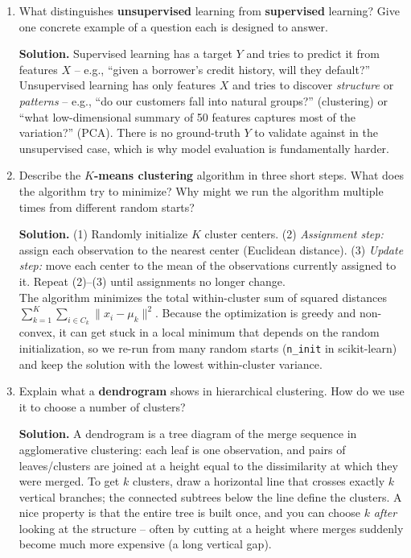 \documentclass[11pt]{article}
\newcommand{\solution}[1]{%
  \par\medskip\noindent\textbf{Solution.} #1\par\medskip
}
\begin{document}
\begin{enumerate}[leftmargin=*, resume]

\item What distinguishes \textbf{unsupervised} learning from \textbf{supervised} learning? Give one concrete example of a question each is designed to answer.

\solution{Supervised learning has a target $Y$ and tries to predict it from features $X$ -- e.g., ``given a borrower's credit history, will they default?'' Unsupervised learning has only features $X$ and tries to discover \emph{structure} or \emph{patterns} -- e.g., ``do our customers fall into natural groups?'' (clustering) or ``what low-dimensional summary of 50 features captures most of the variation?'' (PCA). There is no ground-truth $Y$ to validate against in the unsupervised case, which is why model evaluation is fundamentally harder.}

\item Describe the \textbf{$K$-means clustering} algorithm in three short steps. What does the algorithm try to minimize? Why might we run the algorithm multiple times from different random starts?

\solution{(1) Randomly initialize $K$ cluster centers. (2) \emph{Assignment step:} assign each observation to the nearest center (Euclidean distance). (3) \emph{Update step:} move each center to the mean of the observations currently assigned to it. Repeat (2)--(3) until assignments no longer change.\\
The algorithm minimizes the total within-cluster sum of squared distances $\sum_{k=1}^K \sum_{i \in C_k} \|x_i - \mu_k\|^2$. Because the optimization is greedy and non-convex, it can get stuck in a local minimum that depends on the random initialization, so we re-run from many random starts (\texttt{n\_init} in scikit-learn) and keep the solution with the lowest within-cluster variance.}

\item Explain what a \textbf{dendrogram} shows in hierarchical clustering. How do we use it to choose a number of clusters?

\solution{A dendrogram is a tree diagram of the merge sequence in agglomerative clustering: each leaf is one observation, and pairs of leaves/clusters are joined at a height equal to the dissimilarity at which they were merged. To get $k$ clusters, draw a horizontal line that crosses exactly $k$ vertical branches; the connected subtrees below the line define the clusters. A nice property is that the entire tree is built once, and you can choose $k$ \emph{after} looking at the structure -- often by cutting at a height where merges suddenly become much more expensive (a long vertical gap).}


\end{enumerate}
\end{document}
